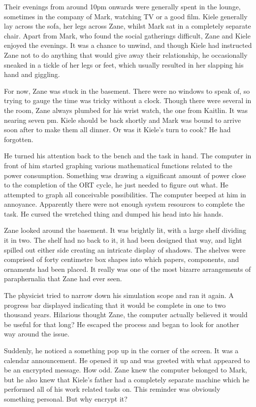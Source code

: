 Their evenings from around 10pm onwards were generally spent in the lounge, sometimes in the company of Mark, watching TV or a good film.  Kiele generally lay across the sofa, her legs across Zane, whilst Mark sat in a completely separate chair.  Apart from Mark, who found the social gatherings difficult, Zane and Kiele enjoyed the evenings.  It was a chance to unwind, and though Kiele had instructed Zane not to do anything that would give away their relationship, he occasionally sneaked in a tickle of her legs or feet, which usually resulted in her slapping his hand and giggling.

For now, Zane was stuck in the basement.  There were no windows to speak of, so trying to gauge the time was tricky without a clock.  Though there were several in the room, Zane always plumbed for his wrist watch, the one from Kaitlin.  It was nearing seven pm.  Kiele should be back shortly and Mark was bound to arrive soon after to make them all dinner.  Or was it Kiele's turn to cook?  He had forgotten.  

He turned his attention back to the bench and the task in hand.  The computer in front of him started graphing various mathematical functions related to the power consumption.  Something was drawing a significant amount of power close to the completion of the ORT cycle, he just needed to figure out what.  He attempted to graph all conceivable possibilities.  The computer beeped at him in annoyance.  Apparently there were not enough system resources to complete the task.  He cursed the wretched thing and dumped his head into his hands.

Zane looked around the basement.  It was brightly lit, with a large shelf dividing it in two.  The shelf had no back to it, it had been designed that way, and light spilled out either side creating an intricate display of shadows.  The shelves were comprised of forty centimetre box shapes into which papers, components, and ornaments had been placed.  It really was one of the most bizarre arrangements of paraphernalia that Zane had ever seen.

The physicist tried to narrow down his simulation scope and ran it again.  A progress bar displayed indicating that it would be complete in one to two thousand years.  Hilarious thought Zane, the computer actually believed it would be useful for that long?  He escaped the process and began to look for another way around the issue.  

Suddenly, he noticed a something pop up in the corner of the screen.  It was a calendar announcement.  He opened it up and was greeted with what appeared to be an encrypted message.  How odd.  Zane knew the computer belonged to Mark, but he also knew that Kiele's father had a completely separate machine which he performed all of his work related tasks on.  This reminder was obviously something personal.  But why encrypt it?  


